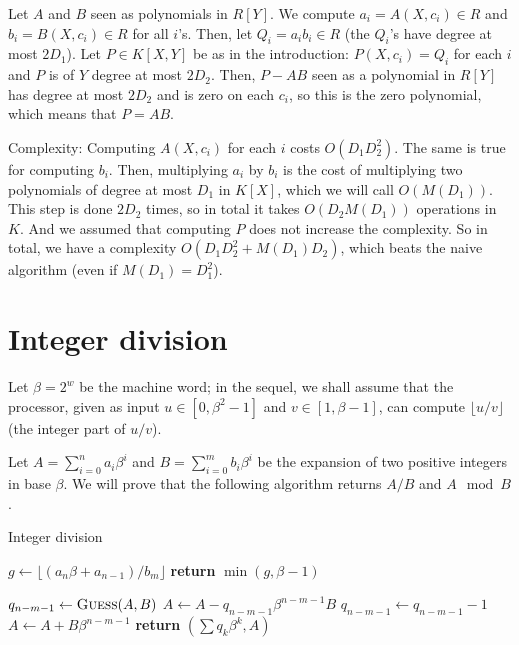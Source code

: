 \documentclass[11pt]{exam}
\theoremstyle{definition}
\begin{document}
{\begin{questions}
\begin{solution}
Let $A$ and $B$ seen as polynomials in $R[Y]$. We compute $a_i = A(X,c_i) \in R$ and $b_i = B(X,c_i) \in R$ for all $i$'s. Then, let $Q_i = a_i b_i \in R$ (the $Q_i$'s have degree at most $2D_1$).
Let $P \in K[X,Y]$ be as in the introduction: $P(X,c_i) = Q_i$ for each $i$ and $P$ is of $Y$ degree at most $2D_2$. Then, $P-AB$ seen as a polynomial in $R[Y]$ has degree at most $2D_2$ and is zero on each $c_i$, so this is the zero polynomial, which means that $P = AB$.

Complexity: Computing $A(X,c_i)$ for each $i$ costs $O(D_1 D_2^2)$. The same is true for computing $b_i$. Then, multiplying $a_i$ by $b_i$ is the cost of multiplying two polynomials of degree at most $D_1$ in $K[X]$, which we will call $O(M(D_1))$. This step is done $2D_2$ times, so in total it takes $O(D_2 M(D_1))$ operations in $K$. And we assumed that computing $P$ does not increase the complexity. So in total, we have a complexity $O(D_1 D_2^2 + M(D_1) D_2)$, which beats the naive algorithm (even if $M(D_1) = D_1^2$).
\end{solution}

\end{questions}

\section{Integer division}

Let $\beta = 2^w$ be the machine word; in the sequel, we shall assume
that the processor, given as input $u \in [0, \beta^2 - 1]$ and $v \in
[1, \beta - 1]$, can compute $\lfloor u/v\rfloor$ (the integer part of
$u/v$).

Let $A = \sum_{i=0}^{n} a_i \beta^i$ and $B = \sum_{i=0}^m b_i \beta^i$ be
the expansion of two positive integers in base $\beta$.
We will prove that the following algorithm returns $A/B$ and $A\mod B$.

\begin{algorithm}
\caption*{Integer division}
\begin{algorithmic}[0]
\State $g\gets \lfloor (a_n \beta + a_{n-1}) / b_m \rfloor$
\State \textbf{return} $\min(g,\beta-1)$
\EndProcedure
\medskip

\State $q_{n-m-1}\gets \textsc{Guess}(A,B)$
\State $A \gets A-q_{n-m-1}\beta^{n-m-1}B$
 
   \State $q_{n-m-1} \gets q_{n-m-1} - 1$
   \State $A \gets A + B \beta^{n-m-1}$
\EndWhile
\EndWhile
\State \textbf{return} $(\sum q_k \beta^k, A)$
\EndProcedure
\end{algorithmic}
\end{algorithm}

}
\end{document}
